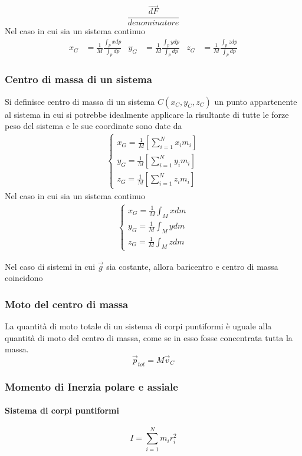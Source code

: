 \documentclass[12pt,a4paper]{report}
\begin{document}
		
		\[ \frac{\vec{dF}}{denominatore}\]
Nel caso in cui sia un sistema continuo
		\begin{align*} 
		x_{G} &= \frac{1}{M}\frac{\int_{p} xdp}{\int_{p} dp}   &  y_{G} &= \frac{1}{M}\frac{\int_{p} ydp}{\int_{p} dp} & z_{G} &=\frac{1}{M}\frac{\int_{p} zdp}{\int_{p} dp}
		\end{align*}
		\subsubsection{Centro di massa di un sistema}
		Si definisce centro di massa di un sistema $C(x_{C},y_{C},z_{C})$ un punto appartenente al sistema in cui si potrebbe idealmente applicare la risultante di tutte le forze peso del sistema e le sue coordinate sono date da
		\begin{align*} 
		\begin{cases} x_{G} = \frac{1}{M} [\sum\limits_{i=1}^N x_{i}m_{i}]   \\ y_{G} = \frac{1}{M}[ \sum\limits_{i=1}^N y_{i}m_{i}] \\ z_{G}= \frac{1}{M}[\sum\limits_{i=1}^N z_{i}m_{i}] \end{cases}
		\end{align*}
Nel caso in cui sia un sistema continuo
		\begin{align*} 
		\begin{cases} x_{G}=\frac{1}{M} \int_{M} xdm   \\ y_{G}= \frac{1}{M}\int_{M} ydm \\ z_{G}= \frac{1}{M}\int_{M} zdm \end{cases}
		\end{align*}

Nel caso di sistemi in cui $\vec{g}$ sia costante, allora baricentro e centro di massa coincidono
		\subsubsection{Moto del centro di massa}
La quantità di moto totale di un sistema di corpi puntiformi è uguale alla quantità di moto del centro di massa, come se in esso fosse concentrata tutta la massa.
			\[\vec{p}_{tot} = M\vec{v}_{C}\]
		\subsubsection{Momento di Inerzia polare e assiale}
			\paragraph{Sistema di corpi puntiformi}
			\[I=\sum\limits_{i=1}^N m_{i}r_{i}^{2}\]
\end{document}
